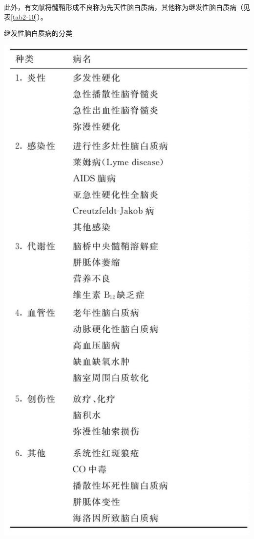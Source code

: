 此外，有文献将髓鞘形成不良称为先天性脑白质病，其他称为继发性脑白质病（见表\ref{tab2-10}）。

\begin{table}[htbp]
\centering
\caption{继发性脑白质病的分类}
\label{tab2-10}
\includegraphics[width=\textwidth,height=\textheight,keepaspectratio]{./images/Image00094.jpg}
\end{table}

